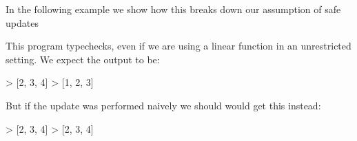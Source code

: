 \documentclass[
]{article}
\newenvironment{Shaded}{}{}
\newcommand{\CommentTok}[1]{\textcolor[rgb]{0.38,0.63,0.69}{\textit{#1}}}
\newcommand{\DataTypeTok}[1]{\textcolor[rgb]{0.56,0.13,0.00}{#1}}
\newcommand{\DecValTok}[1]{\textcolor[rgb]{0.25,0.63,0.44}{#1}}
\newcommand{\FunctionTok}[1]{\textcolor[rgb]{0.02,0.16,0.49}{#1}}
\newcommand{\KeywordTok}[1]{\textcolor[rgb]{0.00,0.44,0.13}{\textbf{#1}}}
\newcommand{\NormalTok}[1]{#1}
\newcommand{\OperatorTok}[1]{\textcolor[rgb]{0.40,0.40,0.40}{#1}}
\newcommand{\OtherTok}[1]{\textcolor[rgb]{0.00,0.44,0.13}{#1}}
\begin{document}
In the following example we show how this breaks down our assumption of
safe updates

\begin{Shaded}
\end{Shaded}

This program typechecks, even if we are using a linear function in an
unrestricted setting. We expect the output to be:

\begin{Shaded}
\begin{Highlighting}[]
\OperatorTok{\textgreater{}}\NormalTok{ [}\DecValTok{2}\NormalTok{, }\DecValTok{3}\NormalTok{, }\DecValTok{4}\NormalTok{]}
\OperatorTok{\textgreater{}}\NormalTok{ [}\DecValTok{1}\NormalTok{, }\DecValTok{2}\NormalTok{, }\DecValTok{3}\NormalTok{]}
\end{Highlighting}
\end{Shaded}

But if the update was performed naively we should would get this
instead:

\begin{Shaded}
\begin{Highlighting}[]
\OperatorTok{\textgreater{}}\NormalTok{ [}\DecValTok{2}\NormalTok{, }\DecValTok{3}\NormalTok{, }\DecValTok{4}\NormalTok{]}
\OperatorTok{\textgreater{}}\NormalTok{ [}\DecValTok{2}\NormalTok{, }\DecValTok{3}\NormalTok{, }\DecValTok{4}\NormalTok{]}
\end{Highlighting}
\end{Shaded}
\end{document}
